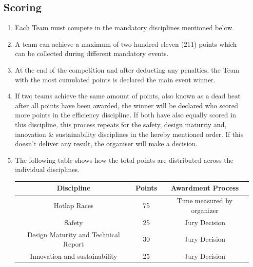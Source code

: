     \subsection{Scoring}
    \begin{enumerate}
      \item Each Team must compete in the mandatory disciplines mentioned below. 
      \item A team can achieve a maximum of two hundred eleven (211) points which can be collected during different mandatory events.
      \item At the end of the competition and after deducting any penalties, the Team with the most cumulated points is declared the main event winner. 
      \item If two teams achieve the same amount of points, also known as a dead heat after all points have been awarded, the winner will be declared who scored more points in the efficiency discipline. 
      If both have also equally scored in this discipline, this process repeats for the safety, design maturity and, innovation \& sustainability disciplines in the hereby mentioned order. If this doesn't deliver any result, the organiser will make a decision. 
      \item The following table shows how the total points are distributed across the individual disciplines. 

      \begin{center}
        \begin{tabular}{|c|c|c|} 
          \hline
          Discipline & Points & Awardment Process \\ 
          \hline
          Hotlap Races & 75 & Time measured by organizer \\ 
          \hline
          Safety & 25 & Jury Decision \\ 
          \hline
          Design Maturity and Technical Report & 30 & Jury Decision \\ 
          \hline
          Innovation and sustainability & 25 & Jury Decision \\ 
          \hline
        \end{tabular}
      \end{center}
    \end{enumerate}

